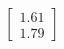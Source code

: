 \documentclass[preview]{standalone}
\begin{document}
\begin{align*}
\begin{bmatrix} 1.61 \\ 1.79 \end{bmatrix}
\end{align*}
\end{document}
